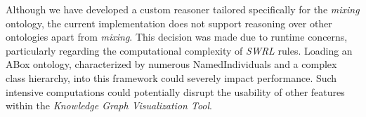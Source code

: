 Although we have developed a custom reasoner tailored specifically for the \textit{mixing} ontology, 
the current implementation does not support reasoning over other ontologies apart from \textit{mixing}. 
This decision was made due to runtime concerns, particularly regarding the computational complexity of \textit{SWRL} rules. 
Loading an ABox ontology, characterized by numerous NamedIndividuals and a complex class hierarchy, into this framework could severely impact performance.
Such intensive computations could potentially disrupt the usability of other features within the \textit{Knowledge Graph Visualization Tool}.